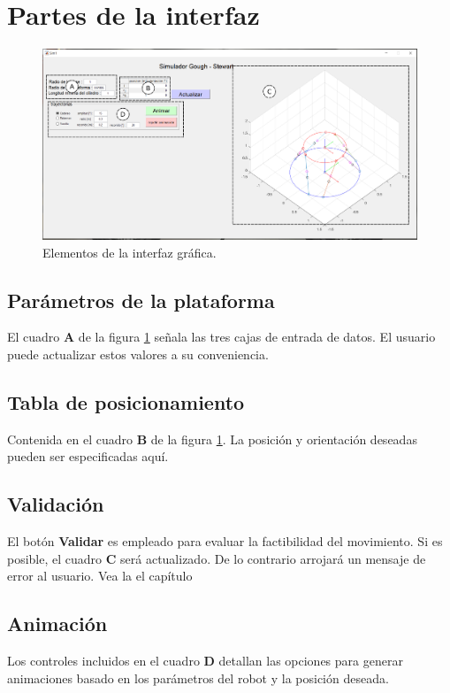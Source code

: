 \section{Partes de la interfaz}

\begin{figure}[ht]
 \centering
 \includegraphics[scale=0.3]{img/gui_labels.PNG}
 \caption{Elementos de la interfaz gráfica.}
 \label{fig: GUI explained}
\end{figure}

\subsection{Parámetros de la plataforma}
El cuadro \textbf{A} de la figura 
\ref{fig: GUI explained} señala las tres cajas de entrada
de datos. El usuario puede actualizar estos valores a su conveniencia.


\subsection{Tabla de posicionamiento}
Contenida en el cuadro \textbf{B} de la figura \ref{fig: GUI explained}.
La posición y orientación deseadas pueden ser especificadas aquí.


\subsection{Validación}
El botón \textbf{Validar} es empleado para evaluar la factibilidad del
movimiento. 
Si es posible, el cuadro \textbf{C} será actualizado. 
De lo contrario arrojará un mensaje de error al usuario. 
Vea la el capítulo 

\subsection{Animación}
Los controles incluidos en el cuadro \textbf{D} detallan las
opciones para generar animaciones basado en los parámetros del robot
y la posición deseada.




